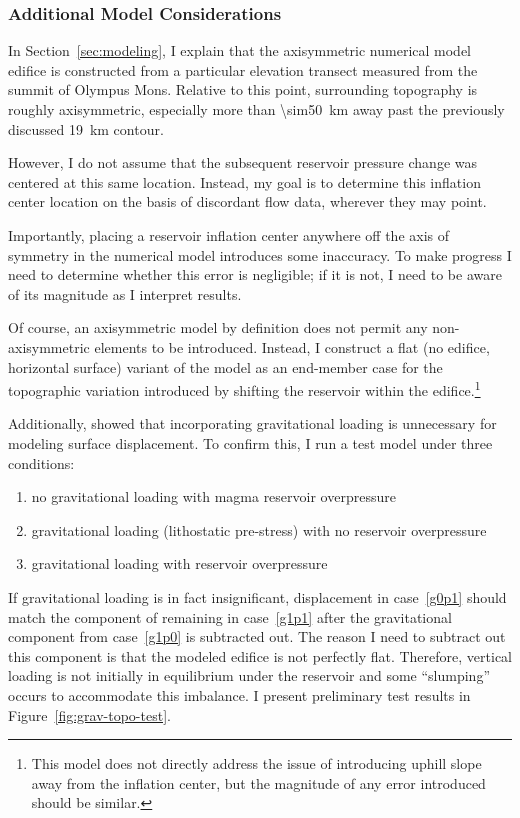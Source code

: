 \subsubsection{Additional Model Considerations}

In Section~\ref{sec:modeling}, I explain that the axisymmetric numerical model edifice is constructed from a particular elevation transect measured from the summit of Olympus Mons. Relative to this point, surrounding topography is roughly axisymmetric, especially more than \qty{\sim50}{\km} away past the previously discussed \qty{19}{\km} contour.

However, I do not assume that the subsequent reservoir pressure change was centered at this same location. Instead, my goal is to  determine this inflation center location on the basis of discordant flow data, wherever they may point.

Importantly, placing a reservoir inflation center anywhere off the axis of symmetry in the numerical model introduces some inaccuracy. To make progress I need to determine whether this error is negligible; if it is not, I need to be aware of its magnitude as I interpret results.

Of course, an axisymmetric model by definition does not permit any non-axisymmetric elements to be introduced. Instead, I construct a flat (no edifice, horizontal surface) variant of the model as an end-member case for the topographic variation introduced by shifting the reservoir within the edifice.\footnote{This model does not directly address the issue of introducing uphill slope away from the inflation center, but the magnitude of any error introduced should be similar.}

Additionally, \textcite{grosfils_magma_2007} showed that incorporating gravitational loading is unnecessary for modeling surface displacement. To confirm this, I run a test model under three conditions:
\begin{enumerate}
    \item no gravitational loading with magma reservoir overpressure \label{g0p1}
    \item gravitational loading (lithostatic pre-stress) with no reservoir overpressure\label{g1p0}
    \item gravitational loading with reservoir overpressure \label{g1p1}
\end{enumerate}
If gravitational loading is in fact insignificant, displacement in case~\ref{g0p1} should match the component of remaining in case~\ref{g1p1} after the gravitational component from case~\ref{g1p0} is subtracted out. The reason I need to subtract out this component is that the modeled edifice is not perfectly flat. Therefore, vertical loading is not initially in equilibrium under the reservoir and some ``slumping'' occurs to accommodate this imbalance. I present preliminary test results in Figure~\ref{fig:grav-topo-test}.

